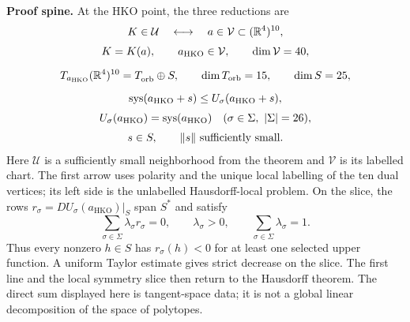 \begin{certificatecheck}
\textbf{Proof spine.}  At the HKO point, the three reductions are
\[
\begin{gathered}
 K\in\mathcal U
 \quad\longleftrightarrow\quad
 a\in\mathcal V\subset(\mathbb R^4)^{10},
 \\[1mm]
 K=K(a),\qquad
 a_{\mathrm{HKO}}\in\mathcal V,\qquad \dim\mathcal V=40,
 \\[2mm]
 T_{a_{\mathrm{HKO}}}(\mathbb R^4)^{10}
   =T_{\mathrm{orb}}^{\vphantom{*}}\oplus S,
 \qquad \dim T_{\mathrm{orb}}=15,
 \qquad \dim S=25,
 \\[2mm]
 \operatorname{sys}(a_{\mathrm{HKO}}+s)\leq
 U_\sigma(a_{\mathrm{HKO}}+s),
 \\[1mm]
 U_\sigma(a_{\mathrm{HKO}})=\operatorname{sys}(a_{\mathrm{HKO}})
 \quad(\sigma\in\Sigma,\ |\Sigma|=26),
 \\[1mm]
 s\in S,\qquad \lVert s\rVert\text{ sufficiently small}.
\end{gathered}
\]
Here \(\mathcal U\) is a sufficiently small neighborhood from the theorem and
\(\mathcal V\) is its labelled chart.  The first arrow uses polarity and the
unique local labelling of the ten dual vertices; its left side is the
unlabelled Hausdorff-local problem.
On the slice, the rows
\(r_\sigma=DU_\sigma(a_{\mathrm{HKO}})|_S\) span \(S^*\) and satisfy
\[
  \sum_{\sigma\in\Sigma}\lambda_\sigma r_\sigma=0,
  \qquad \lambda_\sigma>0,
  \qquad \sum_{\sigma\in\Sigma}\lambda_\sigma=1.
\]
Thus every nonzero \(h\in S\) has \(r_\sigma(h)<0\) for at least one selected
upper function.  A uniform Taylor estimate gives strict decrease on the
slice.  The first line and the local symmetry slice then return to the
Hausdorff theorem.  The direct sum displayed here is tangent-space data; it is
not a global linear decomposition of the space of polytopes.
\end{certificatecheck}





